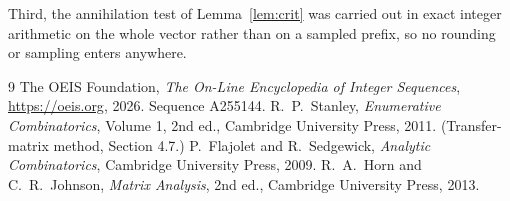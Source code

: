 \documentclass[11pt,a4paper]{article}
\theoremstyle{plain}
\theoremstyle{definition}
\begin{document}
Third, the annihilation test of Lemma~\ref{lem:crit} was carried out in exact integer
arithmetic on the whole vector rather than on a sampled prefix, so no rounding or sampling
enters anywhere.

\begin{thebibliography}{9}
 The OEIS Foundation, \emph{The On-Line Encyclopedia of Integer
Sequences}, \url{https://oeis.org}, 2026. Sequence A255144.
 R.~P.~Stanley, \emph{Enumerative Combinatorics}, Volume 1, 2nd ed.,
Cambridge University Press, 2011. (Transfer-matrix method, Section 4.7.)
 P.~Flajolet and R.~Sedgewick, \emph{Analytic Combinatorics}, Cambridge
University Press, 2009.
 R.~A.~Horn and C.~R.~Johnson, \emph{Matrix Analysis}, 2nd ed., Cambridge
University Press, 2013.
\end{thebibliography}
\end{document}

